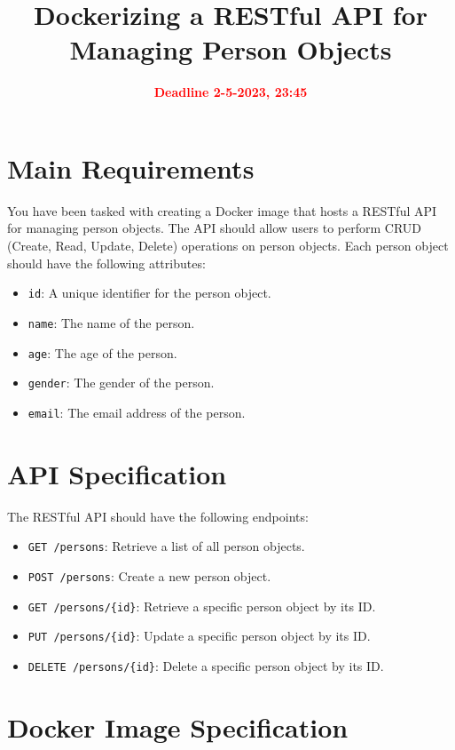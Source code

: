 \documentclass{article}
\title{ Dockerizing a RESTful API for Managing Person Objects}
\author{}
\date{\textbf{\textcolor{red}{Deadline 2-5-2023, 23:45}}}
\begin{document}
\maketitle

\section*{Main Requirements}

You have been tasked with creating a Docker image that hosts a RESTful API for managing person objects. The API should allow users to perform CRUD (Create, Read, Update, Delete) operations on person objects.
Each person object should have the following attributes:

\begin{itemize}
	\item \texttt{id}: A unique identifier for the person object.
	\item \texttt{name}: The name of the person.
	\item \texttt{age}: The age of the person.
	\item \texttt{gender}: The gender of the person.
	\item \texttt{email}: The email address of the person.
\end{itemize}


\section*{API Specification}

The RESTful API should have the following endpoints:

\begin{itemize}
	\item \texttt{GET /persons}: Retrieve a list of all person objects.
	\item \texttt{POST /persons}: Create a new person object.
	\item \texttt{GET /persons/\{id\}}: Retrieve a specific person object by its ID.
	\item \texttt{PUT /persons/\{id\}}: Update a specific person object by its ID.
	\item \texttt{DELETE /persons/\{id\}}: Delete a specific person object by its ID.
\end{itemize}

\section*{Docker Image Specification}
\end{document}
